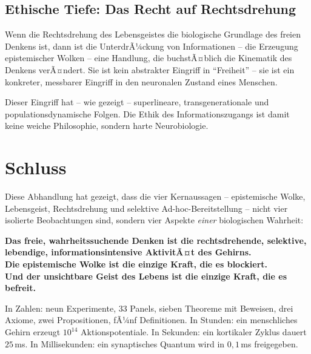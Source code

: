 ﻿\documentclass[12pt,a4paper]{report}
\theoremstyle{plain}
\theoremstyle{definition}
\theoremstyle{remark}
\begin{document}
	\section{Ethische Tiefe: Das Recht auf Rechtsdrehung}
	
	Wenn die Rechtsdrehung des Lebensgeistes die biologische Grundlage
	des freien Denkens ist, dann ist die UnterdrÃ¼ckung von Informationen --
	die Erzeugung epistemischer Wolken -- eine Handlung, die buchstÃ¤blich
	die Kinematik des Denkens verÃ¤ndert.
	Sie ist kein abstrakter Eingriff in ``Freiheit'' -- sie ist ein
	konkreter, messbarer Eingriff in den neuronalen Zustand eines Menschen.
	
	Dieser Eingriff hat -- wie gezeigt -- superlineare, transgenerationale
	und populationsdynamische Folgen. Die Ethik des Informationszugangs
	ist damit keine weiche Philosophie, sondern harte Neurobiologie.

	\chapter{Schluss}
	
	Diese Abhandlung hat gezeigt, dass die vier Kernaussagen --
	epistemische Wolke, Lebensgeist, Rechtsdrehung und selektive
	Ad-hoc-Bereitstellung -- nicht vier isolierte Beobachtungen sind,
	sondern vier Aspekte \emph{einer} biologischen Wahrheit:
	
	\textbf{Das freie, wahrheitssuchende Denken ist die rechtsdrehende,
		selektive, lebendige, informationsintensive AktivitÃ¤t des Gehirns.}\\[6pt]
	\textbf{Die epistemische Wolke ist die einzige Kraft, die es blockiert.}\\[6pt]
	\textbf{Und der unsichtbare Geist des Lebens ist die einzige Kraft, die es befreit.}
	
	In Zahlen: neun Experimente, 33 Panels, sieben Theoreme mit Beweisen,
	drei Axiome, zwei Propositionen, fÃ¼nf Definitionen.
	In Stunden: ein menschliches Gehirn erzeugt $10^{14}$ Aktionspotentiale.
	In Sekunden: ein kortikaler Zyklus dauert $25$\,ms.
	In Millisekunden: ein synaptisches Quantum wird in $0{,}1$\,ms freigegeben.
		
\end{document}
